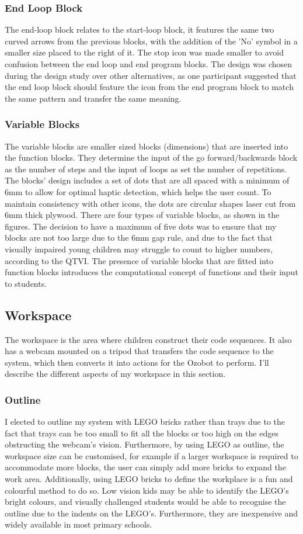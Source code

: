 \documentclass[oneside,%
                    author={Malak Hajji},
                    degree={BSc},
                    title={Designing An Accessible Computational Toolkit For Students},
                  subtitle={With Mixed Visual Abilities}]{dissertation}
\begin{document}
\subsubsection{End Loop Block}
The end-loop block relates to the start-loop block, it features the same two curved arrows from the previous blocks, with the addition of the 'No' symbol in a smaller size placed to the right of it. The stop icon was made smaller to avoid confusion between the end loop and end program blocks. The design was chosen during the design study over other alternatives, as one participant suggested that the end loop block should feature the icon from the end program block to match the same pattern and transfer the same meaning. 
\subsubsection{Variable Blocks}
The variable blocks are smaller sized blocks (dimensions) that are inserted into the function blocks. They determine the input of the go forward/backwards block as the number of steps and the input of loops as set the number of repetitions. The blocks' design includes a set of dots that are all spaced with a minimum of 6mm to allow for optimal haptic detection, which helps the user count. To maintain consistency with other icons, the dots are circular shapes laser cut from 6mm thick plywood. There are four types of variable blocks, as shown in the figures. The decision to have a maximum of five dots was to ensure that my blocks are not too large due to the 6mm gap rule, and due to the fact that visually impaired young children may struggle to count to higher numbers, according to the QTVI. The presence of variable blocks that are fitted into function blocks introduces the computational concept of functions and their input to students. 

\subsection{Workspace}
The workspace is the area where children construct their code sequences. It also has a webcam mounted on a tripod that transfers the code sequence to the system, which then converts it into actions for the Ozobot to perform. I'll describe the different aspects of my workspace in this section.
\subsubsection{Outline}
I elected to outline my system with LEGO bricks rather than trays due to the fact that trays can be too small to fit all the blocks or too high on the edges obstructing the webcam's vision. Furthermore, by using LEGO as outline, the workspace size can be customised, for example if a larger workspace is required to accommodate more blocks, the user can simply add more bricks to expand the work area. Additionally, using LEGO bricks to define the workplace is a fun and colourful method to do so. Low vision kids may be able to identify
the LEGO's bright colours, and visually challenged students would be able to recognise the outline due to the indents on the LEGO's. Furthermore, they are inexpensive and widely available in most primary schools.
\end{document}
